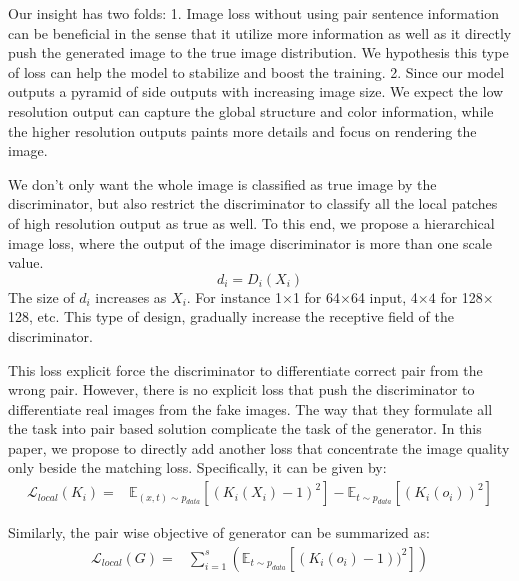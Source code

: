 \documentclass[10pt,twocolumn,letterpaper]{article}
\begin{document}
Our insight has two folds:
1. Image loss without using pair sentence information can be beneficial in the sense that it utilize more information as well as it directly push the generated image to the true image distribution. We hypothesis this type of loss can help the model to stabilize and boost the training. 
2. Since our model outputs a pyramid of side outputs with increasing image size. We expect the low resolution output can capture the global structure and color information, while the higher resolution outputs paints more details and focus on rendering the image. 

We don't only want the whole image is classified as true image by the discriminator, but also restrict the discriminator to classify all the local patches of high resolution output as true as well.   To this end, we propose a hierarchical image loss, where the output of the image  discriminator is more than one scale value.
\begin{equation}
  d_i = D_i(X_i)
\end{equation}
The size of $d_i$ increases as $X_i$. For instance 1$\times$1 for 64$\times$64 input, 4$\times 4$ for 128$\times$128, etc. This type of design, gradually increase the receptive field of the discriminator.

This loss explicit force the discriminator to differentiate correct pair from the wrong pair.  However, there is no explicit loss that push the discriminator to differentiate real images from the fake images. The way that they formulate all the task into pair based solution complicate the task of the generator. In this paper, we propose to directly add another loss that concentrate the image quality only beside the matching loss. Specifically, it can be given by:
\begin{equation}
\label{equ:local}
\begin{split}
\mathcal{L}_{local}(K_i)  = & \mathbb{E}_{(x, t) \sim p_{data}}[(K_i( {X_i}) - 1) ^ 2 ] -  \mathbb{E}_{t \sim p_{data}}[ (K_i( {o}_i))^2 ]  
\end{split}
\end{equation}

Similarly, the pair wise objective of generator can be summarized as:
\begin{equation}
\label{equ:pariG}
\begin{split}
\mathcal{L}_{local}(G)  = & \sum_{i=1}^{s} ( \mathbb{E}_{t \sim p_{data}}[ (K_i( {o}_i) - 1) )^2 ] )
\end{split}
\end{equation}
\end{document}
